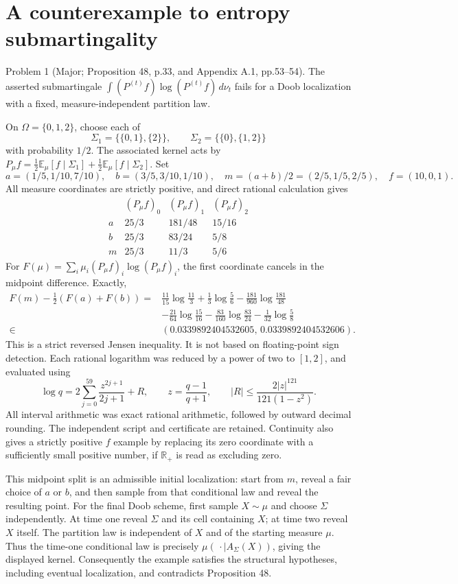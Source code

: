\documentclass[10pt]{article}
\begin{document}
\section*{A counterexample to entropy submartingality}
Problem 1 (Major; Proposition 48, p.33, and Appendix A.1, pp.53–54).  The asserted submartingale \(\int (P^{(t)}f)\log(P^{(t)}f)\,d\nu_t\) fails for a Doob localization with a fixed, measure-independent partition law.\par
On \(\Omega=\{0,1,2\}\), choose each of \[\Sigma_1=\{\{0,1\},\{2\}\},\qquad
 \Sigma_2=\{\{0\},\{1,2\}\}\] with probability \(1/2\). The associated kernel acts by \(P_\mu f=\frac12\mathbb E_\mu[f\mid\Sigma_1]
+\frac12\mathbb E_\mu[f\mid\Sigma_2]\). Set \[a=(1/5,1/10,7/10),\quad b=(3/5,3/10,1/10),\quad
 m=(a+b)/2=(2/5,1/5,2/5),\quad f=(10,0,1).\] All measure coordinates are strictly positive, and direct rational calculation gives \[\begin{array}{c|ccc}
 & (P_\mu f)_0 &(P_\mu f)_1 &(P_\mu f)_2\\ \hline
a&25/3&181/48&15/16\\
b&25/3&83/24&5/8\\
m&25/3&11/3&5/6
\end{array}\] For \(F(\mu)=\sum_i\mu_i(P_\mu f)_i\log(P_\mu f)_i\), the first coordinate cancels in the midpoint difference. Exactly, \[\begin{split}
 F(m)-\tfrac12(F(a)+F(b))
  ={}&\tfrac{11}{15}\log\tfrac{11}{3}
       +\tfrac13\log\tfrac56
       -\tfrac{181}{960}\log\tfrac{181}{48}\\
    &-\tfrac{21}{64}\log\tfrac{15}{16}
       -\tfrac{83}{160}\log\tfrac{83}{24}
       -\tfrac1{32}\log\tfrac58\\
  \in{}&(0.0339892404532605,\,0.0339892404532606).
\end{split}\] This is a strict reversed Jensen inequality. It is not based on floating-point sign detection. Each rational logarithm was reduced by a power of two to \([1,2]\), and evaluated using \[\log q=2\sum_{j=0}^{59}\frac{z^{2j+1}}{2j+1}+R,\qquad
 z=\frac{q-1}{q+1},\qquad
 |R|\le\frac{2|z|^{121}}{121(1-z^2)}.\] All interval arithmetic was exact rational arithmetic, followed by outward decimal rounding. The independent script and certificate are retained. Continuity also gives a strictly positive \(f\) example by replacing its zero coordinate with a sufficiently small positive number, if \(\mathbb R_+\) is read as excluding zero.\par
This midpoint split is an admissible initial localization: start from \(m\), reveal a fair choice of \(a\) or \(b\), and then sample from that conditional law and reveal the resulting point. For the final Doob scheme, first sample \(X\sim\mu\) and choose \(\Sigma\) independently. At time one reveal \(\Sigma\) and its cell containing \(X\); at time two reveal \(X\) itself. The partition law is independent of \(X\) and of the starting measure \(\mu\). Thus the time-one conditional law is precisely \(\mu(\,\cdot\mid A_\Sigma(X))\), giving the displayed kernel. Consequently the example satisfies the structural hypotheses, including eventual localization, and contradicts Proposition 48.\par
\end{document}
